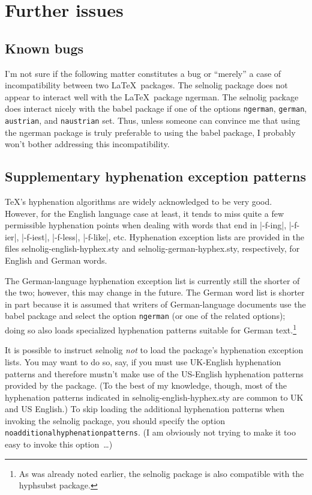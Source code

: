 \documentclass[11pt]{article}
\newcommand{\pkg}[1]{\textsf{#1}}
\newcommand{\opt}[1]{\texttt{#1}}
\begin{document}
\section{Further issues} \label{sec:further}

\subsection{Known bugs}

I'm not sure if the following matter constitutes a bug or \enquote{merely} a case of incompatibility between two \LaTeX\ packages. The \pkg{selnolig} package does not appear to interact well with the \LaTeX\ package \pkg{ngerman}. The \pkg{selnolig} package does interact nicely with the \pkg{babel} package if one of the options \opt{ngerman}, \opt{german}, \opt{austrian}, and \opt{naustrian} set. Thus, unless someone can convince me that using the \pkg{ngerman} package is truly preferable to using the \pkg{babel} package, I probably won't bother addressing this incompatibility.



\subsection{Supplementary hyphenation exception patterns} \label{sec:addlhyph}

\TeX's hyphenation algorithms are widely acknowledged to be very good. However, for the English language case at least, it tends to miss quite a few permissible hyphenation points when dealing with words that end in |-f-ing|, |-f-ier|, |-f-iest|, |-f-less|, |-f-like|, etc. Hyphenation exception lists are provided in the files \pkg{selnolig-english-hyphex.sty} and \pkg{selnolig-german-hyphex.sty}, respectively, for English and German words.

The German-language hyphenation exception list is currently still the shorter of the two; however, this may change in the future. The German word list is shorter in part because it is assumed that writers of German-language documents use the \pkg{babel} package and select the option \opt{ngerman} (or one of the related options); doing so also loads specialized hyphenation patterns suitable for German text.\footnote{As was already noted earlier, the \pkg{selnolig} package is also compatible with the \pkg{hyphsubst} package.} 

It is possible to instruct \pkg{selnolig} \emph{not} to load the package's hyphenation exception lists. You may want to do so, say, if you must use UK-English hyphenation patterns and therefore mustn't make use of the US-English hyphenation patterns provided by the package. (To the best of my knowledge, though, most of the hyphenation patterns indicated in \pkg{selnolig-english-hyphex.sty} are common to UK and US English.) To skip loading the additional hyphenation patterns when invoking the \pkg{selnolig} package, you should specify the option \opt{noadditional\-hyphen\-a\-tion\-patterns}. (I am obviously not trying to make it too easy to invoke this option~\dots)
\end{document}
